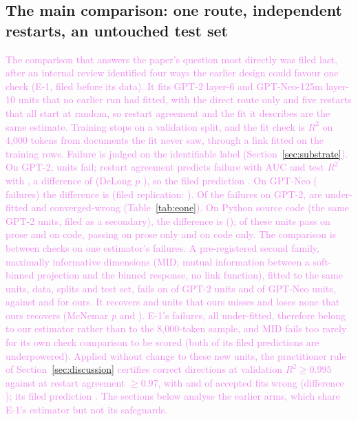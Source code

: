 \documentclass[10pt]{article}
\newcommand{\draft}[1]{\textcolor{violet}{#1}}
\begin{document}
\subsection{The main comparison: one route, independent restarts, an untouched test set}
\label{sec:eone}
\draft{The comparison that answers the paper's question most directly was filed last, after an
internal review identified four ways the earlier design could favour one check (E-1, filed before
its data). It fits \eOneUnits{} GPT-2 layer-6 and \eOneNeoUnits{} GPT-Neo-125m layer-10 units that
no earlier run had fitted, with the direct route only and five restarts that all start at random, so
restart agreement and the fit it describes are the same estimate. Training stops on a validation
split, and the fit check is $R^2$ on 4{,}000 tokens from documents the fit never saw, through a link
fitted on the training rows. Failure is judged on the identifiable label (Section~\ref{sec:substrate}).
On GPT-2, \eOneFail{} units fail; restart agreement predicts failure with AUC \eOneAucRestart{} and
test $R^2$ with \eOneAucTest{}, a difference of \eOneDelta{} \eOneCI{} (DeLong $p$ \eOneP), so the
filed prediction \eOneReading. On GPT-Neo (\eOneNeoFail{} failures) the difference is
\eOneNeoDelta{} \eOneNeoCI{} (filed replication: \eOneNeoReading). Of the failures on GPT-2,
\eOneUf{} are under-fitted and \eOneCw{} converged-wrong (Table~\ref{tab:eone}). On Python source code
(the same GPT-2 units, filed as a secondary), the difference is \eOneCodeDelta{} \eOneCodeCI{}
(\eOneCodeReading); \eOneCodePassProse{} of these units pass on prose and \eOneCodePassCode{} on code,
\eOneCodeLost{} passing on prose only and \eOneCodeGained{} on code only.
The comparison is between checks on one estimator's failures. A pre-registered second family,
maximally informative dimensions (MID; mutual information between a soft-binned projection and the
binned response, no link function), fitted to the same units, data, splits and test set, fails on
\eTwoFail{} of \eTwoUnits{} GPT-2 units and \eTwoNeoFail{} of \eTwoNeoUnits{} GPT-Neo units, against
\eTwoLsFail{} and \eTwoNeoLsFail{} for ours. It recovers \eTwoMidOnly{} and \eTwoNeoMidOnly{} units that
ours misses and loses none that ours recovers (McNemar $p$ \eTwoP{} and \eTwoNeoP). E-1's failures, all
under-fitted, therefore belong to our estimator rather than to the 8{,}000-token sample, and MID fails
too rarely for its own check comparison to be scored (both of its filed predictions are underpowered).
Applied without change to these new units, the practitioner rule of Section~\ref{sec:discussion}
certifies \eOneRuleCorrect{} correct directions at validation $R^2 \geq 0.995$ against
\eOneRuleRestartCorrect{} at restart agreement $\geq 0.97$, with \eOneRuleFcr{} and
\eOneRuleRestartFcr{} of accepted fits wrong (difference \eOneRuleFcrCI); its filed prediction
\eOneRuleHolds. The sections below analyse the earlier arms, which share E-1's estimator but not
its safeguards.}
\end{document}
